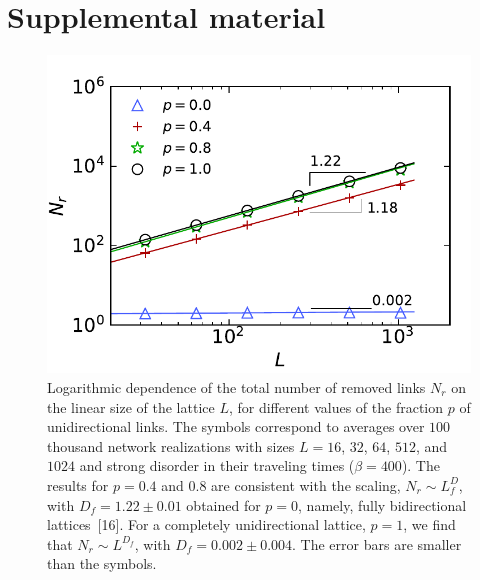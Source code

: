 \documentclass[aps,prl,twocolumn,showpacs, superscriptaddress,floatfix, 10pt]{revtex4-1}
\begin{document}
\section*{Supplemental material}

\setcounter{figure}{0}
\makeatletter 
\renewcommand{\thefigure}{S\@arabic\c@figure}
\makeatother

\begin{figure}[H] 
	\centering
	\includegraphics[width=0.85\columnwidth]{figS1} 
\caption{Logarithmic dependence of the total number of removed links $N_r$
on the linear size of the lattice $L$, for different values of the fraction
$p$ of unidirectional links. The symbols correspond to averages over $100$
thousand network realizations with sizes $L=16$, $32$, $64$, $512$, and
$1024$ and strong disorder in their traveling times ($\beta=400$). The
results for $p=0.4$ and $0.8$ are consistent with the scaling, $N_r\sim
L^D_f$, with $D_{f}=1.22\pm 0.01$ obtained for $p=0$, namely, fully
bidirectional lattices~[16].  For a completely unidirectional lattice,
$p=1$, we find that $N_r\sim L^{D_f}$, with $D_f=0.002\pm 0.004$. The error
bars are smaller than the symbols.} 
\end{figure}
\end{document}
